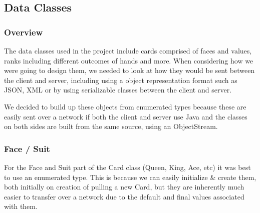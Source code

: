 \documentclass[11pt]{article}
\begin{document}
%	
%	
%	

\newpage

\subsection{Data Classes}


\subsubsection{Overview}
The data classes used in the project include cards comprised of faces and values, ranks including different outcomes of hands and more. When considering how we were going to design them, we needed to look at how they would be sent between the client and server, including using a object representation format such as JSON, XML or by using serializable classes between the client and server.


We decided to build up these objects from enumerated types because these are easily sent over a network if both the client and server use Java and the classes on both sides are built from the same source, using an ObjectStream. %

\subsubsection{Face / Suit}
For the Face and Suit part of the Card class (Queen, King, Ace, etc) it was best to use an enumerated type. This is because we can easily initialize \& create them, both initially on creation of pulling a new Card, but they are inherently much easier to transfer over a network due to the default and final values associated with them. \\
\end{document}
